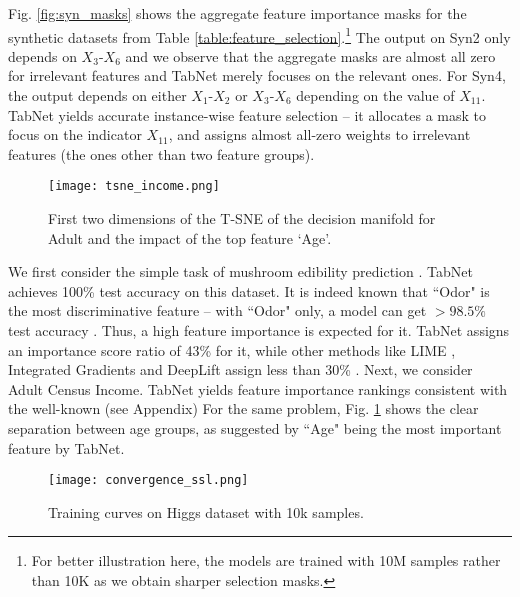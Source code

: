 \vspace{0cm}
\noindent{} Fig. \ref{fig:syn_masks} shows the aggregate feature importance masks for the synthetic datasets from Table \ref{table:feature_selection}.\footnote{For better illustration here, the models are trained with 10M samples rather than 10K as we obtain sharper selection masks.} The output on Syn2 only depends on $X_3$-$X_6$ and we observe that the aggregate masks are almost all zero for irrelevant features and TabNet merely focuses on the relevant ones. 
For Syn4, the output depends on either $X_1$-$X_2$ or $X_3$-$X_6$ depending on the value of $X_{11}$. 
TabNet yields accurate instance-wise feature selection -- it allocates a mask to focus on the indicator $X_{11}$, and assigns almost all-zero weights to irrelevant features (the ones other than two feature groups).

\begin{figure}[!htbp]
\centering
\texttt{[image: tsne\_income.png]}
\caption{First two dimensions of the T-SNE of the decision manifold for Adult and the impact of the top feature `Age'.}
\label{fig:tsne}
\end{figure}

\vspace{0cm}
\noindent{} We first consider the simple task of mushroom edibility prediction \citep{UCI}. TabNet achieves 100\% test accuracy on this dataset. It is indeed known \citep{UCI} that ``Odor" is the most discriminative feature -- with ``Odor" only, a model can get $>98.5 \%$ test accuracy \citep{UCI}. Thus, a high feature importance is expected for it. TabNet assigns an importance score ratio of 43\% for it, while other methods like LIME \citep{lime}, Integrated Gradients \citep{integrated_gradients} and DeepLift \citep{deeplift} assign less than 30\% \citep{global_explanations}.
Next, we consider Adult Census Income.
TabNet yields feature importance rankings consistent with the well-known \citep{shap, nbviewer} (see Appendix) 
For the same problem, Fig. \ref{fig:tsne} shows the clear separation between age groups, as suggested by ``Age" being the most important feature by TabNet. 

\begin{figure}[!htbp]
\centering
\texttt{[image: convergence\_ssl.png]}
\vspace{0cm}
\caption{Training curves on Higgs dataset with 10k samples.}
\label{fig:ssl_training}
\end{figure}

